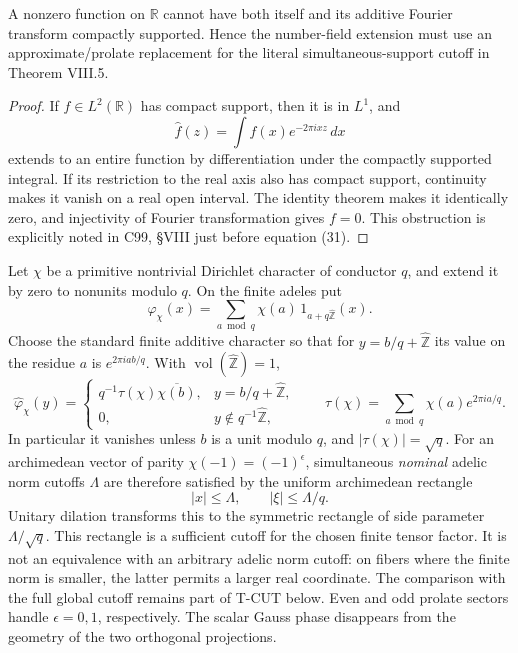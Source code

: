 \begin{proposition}
\label{AC-T10}
A nonzero function on \(\mathbb R\) cannot have
both itself and its additive Fourier transform
compactly supported. Hence the number-field
extension must use an approximate/prolate
replacement for the literal simultaneous-support
cutoff in Theorem VIII.5.
\end{proposition}

\begin{proof}
If \(f\in L^2(\mathbb R)\) has compact support,
then it is in \(L^1\), and
\[
 \widehat f(z)=\int f(x)e^{-2\pi i xz}\,dx
\]
extends to an entire function by differentiation
under the compactly supported integral.
If its restriction to the real axis also has
compact support, continuity makes it vanish
on a real open interval. The identity theorem
makes it identically zero, and injectivity
of Fourier transformation gives \(f=0\).
This obstruction is explicitly noted in
C99, \S VIII just before equation (31).
\end{proof}

\begin{proposition}
\label{AC-T11}
Let \(\chi\) be a primitive nontrivial Dirichlet
character of conductor \(q\), and extend it
by zero to nonunits modulo \(q\). On the finite
adeles put
\[
 \varphi_\chi(x)=
   \sum_{a\bmod q}\chi(a)\,
                     1_{a+q\widehat{\mathbb Z}}(x).
                                                               \tag{T.21}
\]
Choose the standard finite additive character
so that for \(y=b/q+\widehat{\mathbb Z}\) its
value on the residue \(a\) is \(e^{2\pi iab/q}\).
With \(\operatorname{vol}(\widehat{\mathbb Z})=1\),
\[
 \widehat\varphi_\chi(y)=
 \begin{cases}
 q^{-1}\tau(\chi)\overline{\chi(b)},&
           y=b/q+\widehat{\mathbb Z},\\
 0,&y\notin q^{-1}\widehat{\mathbb Z},
 \end{cases}
 \qquad
 \tau(\chi)=\sum_{a\bmod q}\chi(a)e^{2\pi ia/q}.                 \tag{T.22}
\]
In particular it vanishes unless \(b\) is a unit
modulo \(q\), and \(|\tau(\chi)|=\sqrt q\).
For an archimedean vector of parity
\(\chi(-1)=(-1)^\epsilon\), simultaneous
\emph{nominal} adelic norm cutoffs \(\Lambda\)
are therefore satisfied by the uniform archimedean rectangle
\[
 |x|\leq\Lambda,\qquad
 |\xi|\leq\Lambda/q.                                         \tag{T.23}
\]
Unitary dilation transforms this to the symmetric
rectangle of side parameter \(\Lambda/\sqrt q\).
This rectangle is a sufficient cutoff for the chosen finite tensor
factor.  It is not an equivalence with an arbitrary adelic norm
cutoff: on fibers where the finite norm is smaller, the latter
permits a larger real coordinate.  The comparison with the full
global cutoff remains part of T-CUT below.
Even and odd prolate sectors handle
\(\epsilon=0,1\), respectively. The scalar
Gauss phase disappears from the geometry of the
two orthogonal projections.
\end{proposition}

